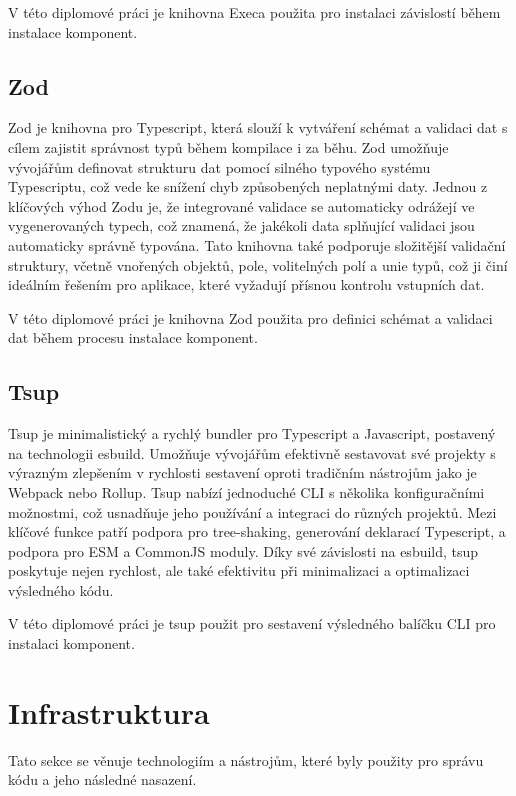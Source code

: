 V této diplomové práci je knihovna Execa použita pro instalaci závislostí během instalace komponent.

\subsection{Zod}
Zod je knihovna pro Typescript, která slouží k vytváření schémat a validaci dat s cílem zajistit správnost typů během kompilace i za běhu. Zod umožňuje vývojářům definovat strukturu dat pomocí silného typového systému Typescriptu, což vede ke snížení chyb způsobených neplatnými daty. Jednou z klíčových výhod Zodu je, že integrované validace se automaticky odrážejí ve vygenerovaných typech, což znamená, že jakékoli data splňující validaci jsou automaticky správně typována. Tato knihovna také podporuje složitější validační struktury, včetně vnořených objektů, pole, volitelných polí a unie typů, což ji činí ideálním řešením pro aplikace, které vyžadují přísnou kontrolu vstupních dat. \cite{Zod}

V této diplomové práci je knihovna Zod použita pro definici schémat a validaci dat během procesu instalace komponent.

\subsection{Tsup}
Tsup je minimalistický a rychlý bundler pro Typescript a Javascript, postavený na technologii esbuild. Umožňuje vývojářům efektivně sestavovat své projekty s výrazným zlepšením v rychlosti sestavení oproti tradičním nástrojům jako je Webpack nebo Rollup. Tsup nabízí jednoduché CLI s několika konfiguračními možnostmi, což usnadňuje jeho používání a integraci do různých projektů. Mezi klíčové funkce patří podpora pro tree-shaking, generování deklarací Typescript, a podpora pro ESM a CommonJS moduly. Díky své závislosti na esbuild, tsup poskytuje nejen rychlost, ale také efektivitu při minimalizaci a optimalizaci výsledného kódu.  \cite{Tsup}

V této diplomové práci je tsup použit pro sestavení výsledného balíčku CLI pro instalaci komponent.

\section{Infrastruktura}
Tato sekce se věnuje technologiím a nástrojům, které byly použity pro správu kódu a jeho následné nasazení.

